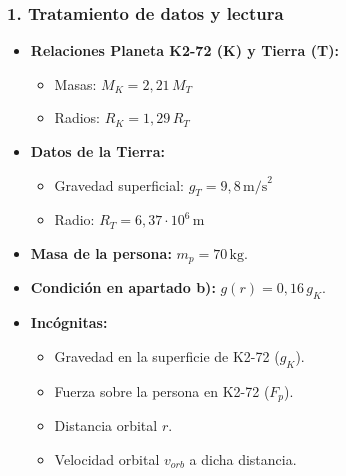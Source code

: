 \subsubsection*{1. Tratamiento de datos y lectura}
\begin{itemize}
    \item \textbf{Relaciones Planeta K2-72 (K) y Tierra (T):}
    \begin{itemize}
        \item Masas: $M_K = 2,21 \, M_T$
        \item Radios: $R_K = 1,29 \, R_T$
    \end{itemize}
    \item \textbf{Datos de la Tierra:}
    \begin{itemize}
        \item Gravedad superficial: $g_T = 9,8 \, \text{m/s}^2$
        \item Radio: $R_T = 6,37 \cdot 10^6 \, \text{m}$
    \end{itemize}
    \item \textbf{Masa de la persona:} $m_p = 70 \, \text{kg}$.
    \item \textbf{Condición en apartado b):} $g(r) = 0,16 \, g_K$.
    \item \textbf{Incógnitas:}
    \begin{itemize}
        \item Gravedad en la superficie de K2-72 ($g_K$).
        \item Fuerza sobre la persona en K2-72 ($F_p$).
        \item Distancia orbital $r$.
        \item Velocidad orbital $v_{orb}$ a dicha distancia.
    \end{itemize}
\end{itemize}

